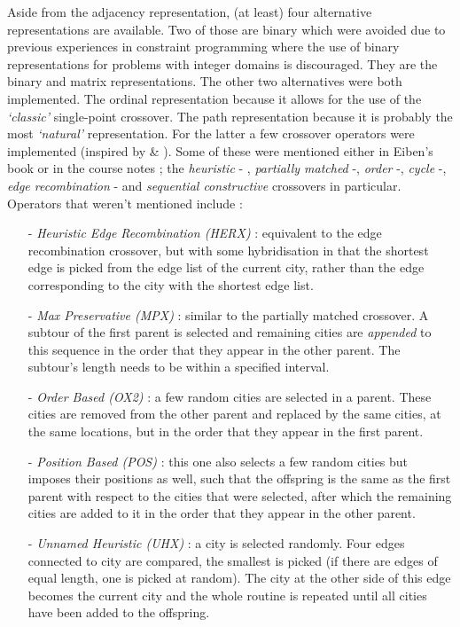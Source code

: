 Aside from the adjacency representation, (at least) four alternative representations are available. Two of those are binary which were avoided due to previous experiences in constraint programming where the use of binary representations for problems with integer domains is discouraged. They are the binary and matrix representations. The other two alternatives were both implemented. The ordinal representation because it allows for the use of the \textit{`classic'} single-point crossover. The path representation because it is probably the most \textit{`natural'} representation. For the latter a few crossover operators were implemented (inspired by \cite{larraaga} \& \cite{imskhan}). Some of these were mentioned either in Eiben's book or in the course notes ; the \textit{heuristic} - , \textit{partially matched} -, \textit{order} -, \textit{cycle} -, \textit{edge recombination} - and \textit{sequential constructive} crossovers in particular. Operators that weren't mentioned include : 
\begin{itemize}
\item[-] \textit{Heuristic Edge Recombination (HERX)} : equivalent to the edge recombination crossover, but with some hybridisation in that the shortest edge is picked from the edge list of the current city, rather than the edge corresponding to the city with the shortest edge list.
\item[-] \textit{Max Preservative (MPX)} : similar to the partially matched crossover. A subtour of the first parent is selected and remaining cities are \textit{appended} to this sequence in the order that they appear in the other parent. The subtour's length needs to be within a specified interval.
\item[-] \textit{Order Based (OX2)} : a few random cities are selected in a parent. These cities are removed from the other parent and replaced by the same cities, at the same locations, but in the order that they appear in the first parent.
\item[-] \textit{Position Based (POS)} : this one also selects a few random cities but imposes their positions as well, such that the offspring is the same as the first parent with respect to the cities that were selected, after which the remaining cities are added to it in the order that they appear in the other parent.
\item[-] \textit{Unnamed Heuristic (UHX)} : a city is selected randomly. Four edges connected to city are compared, the smallest is picked (if there are edges of equal length, one is picked at random). The city at the other side of this edge becomes the current city and the whole routine is repeated until all cities have been added to the offspring.
\end{itemize}
